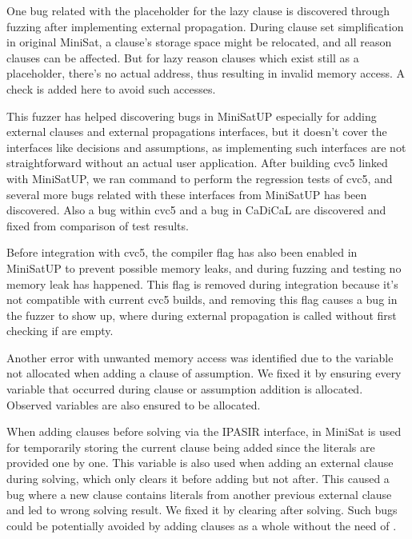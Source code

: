 One bug related with the placeholder for the lazy clause is discovered through fuzzing after implementing external propagation. During clause set simplification in original MiniSat, a clause's storage space might be relocated, and all reason clauses can be affected. But for lazy reason clauses which exist still as a placeholder, there's no actual address, thus resulting in invalid memory access. A check is added here to avoid such accesses.

This fuzzer has helped discovering bugs in MiniSatUP especially for adding external clauses and external propagations interfaces, but it doesn't cover the interfaces like decisions and assumptions, as implementing such interfaces are not straightforward without an actual user application. After building cvc5 linked with MiniSatUP, we ran  command to perform the regression tests of cvc5, and several more bugs related with these interfaces from MiniSatUP has been discovered. Also a bug within cvc5 and a bug in CaDiCaL are discovered and fixed from comparison of test results.

Before integration with cvc5, the compiler flag  has also been enabled in MiniSatUP to prevent possible memory leaks, and during fuzzing and testing no memory leak has happened. This flag is removed during integration because it's not compatible with current cvc5 builds, and removing this flag causes a bug in the fuzzer to show up, where during external propagation  is called without first checking if  are empty.

Another error with unwanted memory access was identified due to the variable not allocated when adding a clause of assumption. We fixed it by ensuring every variable that occurred during clause or assumption addition is allocated. Observed variables are also ensured to be allocated.

When adding clauses before solving via the IPASIR interface,  in MiniSat is used for temporarily storing the current clause being added since the literals are provided one by one. This variable is also used when adding an external clause during solving, which only clears it before adding but not after. This caused a bug where a new clause contains literals from another previous external clause and led to wrong solving result. We fixed it by clearing  after solving. Such bugs could be potentially avoided by adding clauses as a whole without the need of .

